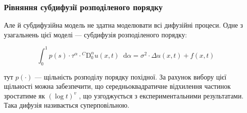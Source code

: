 \documentclass[ukrainian]{beamer}
\newcommand*\diff{\mathop{}\!\mathrm{d}}
\newcommand{\DzC}{{}^{C}\mathrm{D}_{0}}
\begin{document}
\begin{frame}

\frametitle{Рівняння субдифузії розподіленого порядку}

Але й субдифузійна модель не здатна моделювати всі дифузійні процеси. Одне з узагальнень цієї моделі --- субдифузія розподіленого порядку:

\begin{equation}\label{distr_order}
\int_0^1p(s)\cdot\tau^\alpha\cdot\DzC^{\alpha}u(x,t)\diff\alpha=\sigma^2\cdot\Delta{u}(x,t)+f(x,t)
\end{equation}

тут $p(\cdot)$ --- щільність розподілу порядку похідної. За рахунок вибору цієї щільності можна забезпечити, що середньоквадратичне відхилення частинок зростатиме як $(\log{t})^v$ \cite{}, що узгоджується з експериментальними результатами. Така дифузія називається суперповільною.

\end{frame}
\end{document}
